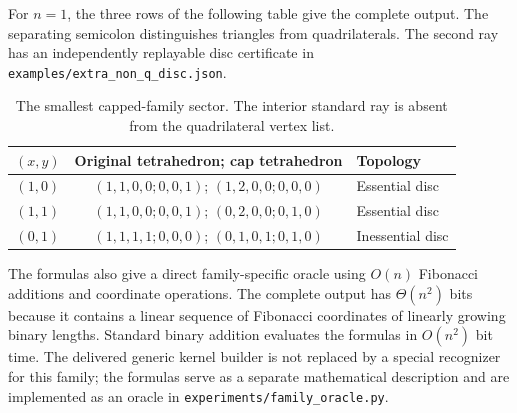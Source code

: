 For $n=1$, the three rows of the following table give the complete output.
The separating semicolon distinguishes triangles from quadrilaterals. The
second ray has an independently replayable disc certificate in
\texttt{examples/extra\_non\_q\_disc.json}.

\begin{table}[ht]
\centering\small
\begin{tabular}{@{}ccl@{}}
\toprule
$(x,y)$ & Original tetrahedron; cap tetrahedron & Topology\\
\midrule
$(1,0)$ & $(1,1,0,0;0,0,1)$; $(1,2,0,0;0,0,0)$ & Essential disc\\
$(1,1)$ & $(1,1,0,0;0,0,1)$; $(0,2,0,0;0,1,0)$ & Essential disc\\
$(0,1)$ & $(1,1,1,1;0,0,0)$; $(0,1,0,1;0,1,0)$ & Inessential disc\\
\bottomrule
\end{tabular}
\caption{The smallest capped-family sector. The interior standard ray is
absent from the quadrilateral vertex list.}
\end{table}

The formulas also give a direct family-specific oracle using $O(n)$
Fibonacci additions and coordinate operations. The complete output has
$\Theta(n^2)$ bits because it contains a linear sequence of Fibonacci
coordinates of linearly growing binary lengths. Standard binary addition
evaluates the formulas in $O(n^2)$ bit time. The delivered generic kernel
builder is not replaced by a special recognizer for this family; the formulas
serve as a separate mathematical description and are implemented as an oracle
in \texttt{experiments/family\_oracle.py}.
